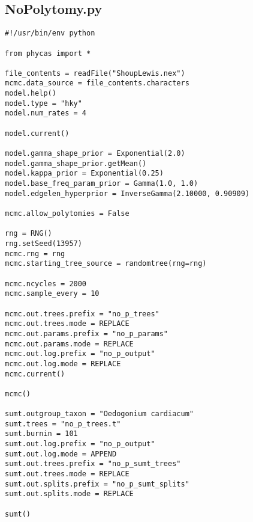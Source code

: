 \documentclass{article}
\begin{document}
\newpage
\subsection{NoPolytomy.py}\label{NoPolytomy}
\begin{verbatim}
#!/usr/bin/env python

from phycas import *

file_contents = readFile("ShoupLewis.nex")
mcmc.data_source = file_contents.characters
model.help()
model.type = "hky"
model.num_rates = 4

model.current()

model.gamma_shape_prior = Exponential(2.0)
model.gamma_shape_prior.getMean()
model.kappa_prior = Exponential(0.25)
model.base_freq_param_prior = Gamma(1.0, 1.0)
model.edgelen_hyperprior = InverseGamma(2.10000, 0.90909)

mcmc.allow_polytomies = False

rng = RNG()
rng.setSeed(13957)
mcmc.rng = rng
mcmc.starting_tree_source = randomtree(rng=rng)

mcmc.ncycles = 2000
mcmc.sample_every = 10

mcmc.out.trees.prefix = "no_p_trees" 
mcmc.out.trees.mode = REPLACE 
mcmc.out.params.prefix = "no_p_params" 
mcmc.out.params.mode = REPLACE 
mcmc.out.log.prefix = "no_p_output" 
mcmc.out.log.mode = REPLACE 
mcmc.current()

mcmc()

sumt.outgroup_taxon = "Oedogonium cardiacum" 
sumt.trees = "no_p_trees.t" 
sumt.burnin = 101 
sumt.out.log.prefix = "no_p_output" 
sumt.out.log.mode = APPEND 
sumt.out.trees.prefix = "no_p_sumt_trees" 
sumt.out.trees.mode = REPLACE 
sumt.out.splits.prefix = "no_p_sumt_splits" 
sumt.out.splits.mode = REPLACE 

sumt()
\end{verbatim}


\newpage
\end{document}
